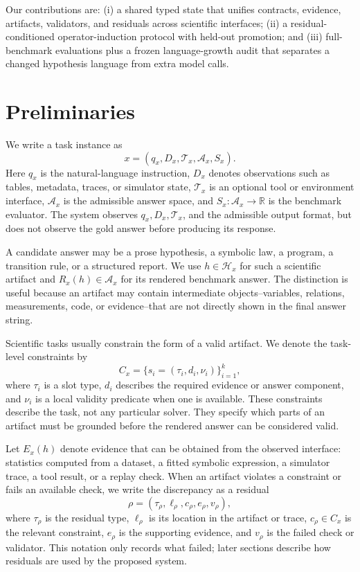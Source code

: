\documentclass[letterpaper]{article}
\begin{document}
Our contributions are: (i) a shared typed state that unifies contracts,
evidence, artifacts, validators, and residuals across scientific interfaces;
(ii) a residual-conditioned operator-induction protocol with held-out
promotion; and (iii) full-benchmark evaluations plus a frozen language-growth
audit that separates a changed hypothesis language from extra model calls.

\section{Preliminaries}

We write a task instance as
\begin{equation}
  x=(q_x,D_x,\mathcal{T}_x,\mathcal{A}_x,S_x).
\end{equation}
Here $q_x$ is the natural-language instruction, $D_x$ denotes observations such
as tables, metadata, traces, or simulator state, $\mathcal{T}_x$ is an optional
tool or environment interface, $\mathcal{A}_x$ is the admissible answer space,
and $S_x:\mathcal{A}_x\rightarrow\mathbb{R}$ is the benchmark evaluator. The
system observes $q_x,D_x,\mathcal{T}_x$, and the admissible output format, but
does not observe the gold answer before producing its response.

A candidate answer may be a prose hypothesis, a symbolic law, a program, a
transition rule, or a structured report. We use $h\in\mathcal{H}_x$ for such a
scientific artifact and $R_x(h)\in\mathcal{A}_x$ for its rendered benchmark
answer. The distinction is useful because an artifact may contain intermediate
objects--variables, relations, measurements, code, or evidence--that are not
directly shown in the final answer string.

Scientific tasks usually constrain the form of a valid artifact. We denote the
task-level constraints by
\begin{equation}
  C_x=\{s_i=(\tau_i,d_i,\nu_i)\}_{i=1}^{k},
\end{equation}
where $\tau_i$ is a slot type, $d_i$ describes the required evidence or answer
component, and $\nu_i$ is a local validity predicate when one is available.
These constraints describe the task, not any particular solver. They specify
which parts of an artifact must be grounded before the rendered answer can be
considered valid.

Let $E_x(h)$ denote evidence that can be obtained from the observed interface:
statistics computed from a dataset, a fitted symbolic expression, a simulator
trace, a tool result, or a replay check. When an artifact violates a constraint
or fails an available check, we write the discrepancy as a residual
\begin{equation}
  \rho=(\tau_\rho,\ell_\rho,c_\rho,e_\rho,v_\rho),
\end{equation}
where $\tau_\rho$ is the residual type, $\ell_\rho$ is its location in the
artifact or trace, $c_\rho\in C_x$ is the relevant constraint, $e_\rho$ is the
supporting evidence, and $v_\rho$ is the failed check or validator. This
notation only records what failed; later sections describe how residuals are
used by the proposed system.
\end{document}
